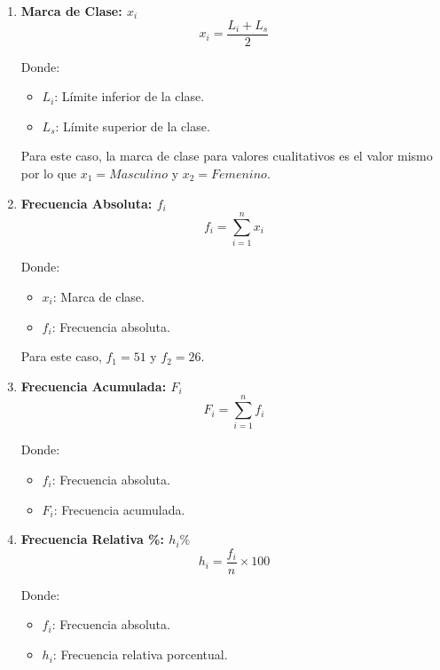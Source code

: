 \documentclass{article}
\begin{document}
  \begin{multicols}{2}
    \begin{enumerate}
      \item \begin{center}
        \textbf{Marca de Clase: $x_i$}
        \hrulefill
        \begin{equation*}
            x_i = \frac{L_i + L_s}{2}
        \end{equation*}
    \end{center}
    Donde:
    \begin{itemize}
        \item $L_i$: Límite inferior de la clase.
        \item $L_s$: Límite superior de la clase.
    \end{itemize}
    Para este caso, la marca de clase para valores cualitativos es el valor mismo por lo que $x_1 = Masculino$ y $x_2 = Femenino$.

    \item \begin{center}
        \textbf{Frecuencia Absoluta: $f_i$}
        \hrulefill
        \begin{equation*}
          f_i = \sum_{i=1}^{n} x_i
        \end{equation*}
    \end{center}
    \vspace{-0.5cm}
    Donde:
    \begin{itemize}
        \item $x_i$: Marca de clase.
        \item $f_i$: Frecuencia absoluta.
    \end{itemize}
    Para este caso, $f_1 = 51$ y $f_2 = 26$.

    \item \begin{center}
      \textbf{Frecuencia Acumulada: $F_i$}
      \hrulefill
      \begin{equation*}
        F_i = \sum_{i=1}^{n} f_i
      \end{equation*}
    \end{center}
    Donde:
    \begin{itemize}
        \item $f_i$: Frecuencia absoluta.
        \item $F_i$: Frecuencia acumulada.
    \end{itemize}

    \item \begin{center}
      \textbf{Frecuencia Relativa \%: $h_i\%$}
      \hrulefill
      \begin{equation*}
        h_i = \frac{f_i}{n} \times 100
      \end{equation*}
    \end{center}
    \vspace{-1cm}
    Donde:
    \begin{itemize}
        \item $f_i$: Frecuencia absoluta.
        \item $h_i$: Frecuencia relativa porcentual.
    \end{itemize}


\end{enumerate}
\end{multicols}
\end{document}

